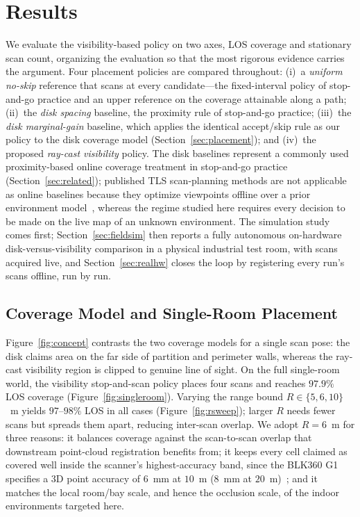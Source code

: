 \documentclass[sensors,article,submit,pdftex,moreauthors]{Definitions/mdpi}
\begin{document}
\section{Results}
\label{sec:results}

We evaluate the visibility-based policy on two axes, LOS coverage and
stationary scan count, organizing the evaluation so that the most rigorous
evidence carries the argument. Four placement policies are compared throughout:
(i)~a \emph{uniform no-skip} reference that scans at every candidate---the
fixed-interval policy of stop-and-go practice and an upper reference on the
coverage attainable along a path; (ii)~the \emph{disk spacing} baseline, the
proximity rule of stop-and-go practice; (iii)~the \emph{disk marginal-gain}
baseline, which applies the identical accept/skip rule as our policy to the
disk coverage model (Section~\ref{sec:placement}); and (iv)~the proposed
\emph{ray-cast visibility} policy. The disk baselines represent a commonly
used proximity-based online coverage treatment in stop-and-go practice
(Section~\ref{sec:related}); published TLS scan-planning methods are not
applicable as online baselines because they optimize viewpoints offline over a
prior environment model~\cite{tls-scanplanning,dehbi2021,knechtel2025},
whereas the regime studied here requires every decision to be made on the live
map of an unknown environment. The simulation study comes first;
Section~\ref{sec:fieldsim} then reports a fully autonomous on-hardware
disk-versus-visibility comparison in a physical industrial test room, with
scans acquired live, and Section~\ref{sec:realhw} closes the loop by
registering every run's scans offline, run by run.

\subsection{Coverage Model and Single-Room Placement}

Figure~\ref{fig:concept} contrasts the two coverage models for a single scan
pose: the disk claims area on the far side of partition and perimeter walls,
whereas the ray-cast visibility region is clipped to genuine line of sight. On
the full single-room world, the visibility stop-and-scan policy places four
scans and reaches $97.9\%$ LOS coverage (Figure~\ref{fig:singleroom}). Varying
the range bound $R\in\{5,6,10\}$~m yields $97$--$98\%$ LOS in all cases
(Figure~\ref{fig:rsweep}); larger $R$ needs fewer scans but spreads them apart,
reducing inter-scan overlap. We adopt $R=6$~m for three reasons: it balances
coverage against the scan-to-scan overlap that downstream point-cloud
registration benefits from; it keeps every cell claimed as covered well inside
the scanner's highest-accuracy band, since the BLK360 G1 specifies a 3D point
accuracy of $6$~mm at $10$~m ($8$~mm at $20$~m)~\cite{leica-blk360}; and it
matches the local room/bay scale, and hence the occlusion scale, of the indoor
environments targeted here.
\end{document}

